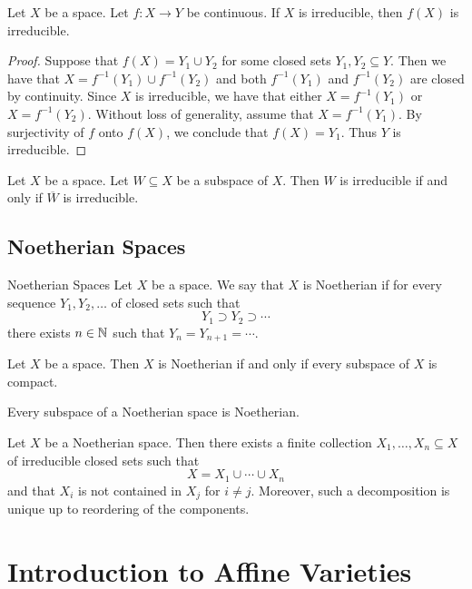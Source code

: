 \documentclass[a4paper]{article}
\begin{document}
\begin{prp}{}{} Let $X$ be a space. Let $f:X\to Y$ be continuous. If $X$ is irreducible, then $f(X)$ is irreducible. \tcbline
\begin{proof}
Suppose that $f(X)=Y_1\cup Y_2$ for some closed sets $Y_1,Y_2\subseteq Y$. Then we have that $X=f^{-1}(Y_1)\cup f^{-1}(Y_2)$ and both $f^{-1}(Y_1)$ and $f^{-1}(Y_2)$ are closed by continuity. Since $X$ is irreducible, we have that either $X=f^{-1}(Y_1)$ or $X=f^{-1}(Y_2)$. Without loss of generality, assume that $X=f^{-1}(Y_1)$. By surjectivity of $f$ onto $f(X)$, we conclude that $f(X)=Y_1$. Thus $Y$ is irreducible. 
\end{proof}
\end{prp}

\begin{lmm}{}{} Let $X$ be a space. Let $W\subseteq X$ be a subspace of $X$. Then $W$ is irreducible if and only if $\overline{W}$ is irreducible. 
\end{lmm}

\subsection{Noetherian Spaces}
\begin{defn}{Noetherian Spaces}{} Let $X$ be a space. We say that $X$ is Noetherian if for every sequence $Y_1,Y_2,\dots$ of closed sets such that $$Y_1\supset Y_2\supset\cdots$$ there exists $n\in\mathbb{N}$ such that $Y_n=Y_{n+1}=\cdots$. 
\end{defn}

\begin{prp}{}{} Let $X$ be a space. Then $X$ is Noetherian if and only if every subspace of $X$ is compact. 
\end{prp}

\begin{prp}{}{} Every subspace of a Noetherian space is Noetherian. 
\end{prp}

\begin{thm}{}{} Let $X$ be a Noetherian space. Then there exists a finite collection $X_1,\dots,X_n\subseteq X$ of irreducible closed sets such that $$X=X_1\cup\cdots\cup X_n$$ and that $X_i$ is not contained in $X_j$ for $i\neq j$. Moreover, such a decomposition is unique up to reordering of the components. 
\end{thm}

\pagebreak
\section{Introduction to Affine Varieties}
\end{document}
